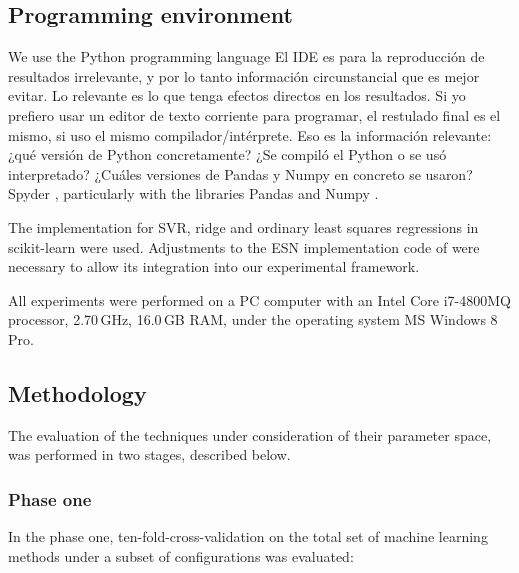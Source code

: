 \subsection{Programming environment}

We use the Python programming language %
{El IDE es para la reproducción de resultados irrelevante, y por lo
  tanto información circunstancial que es mejor evitar.  Lo relevante
  es lo que tenga efectos directos en los resultados.  Si yo prefiero
  usar un editor de texto corriente para programar, el restulado final
  es el mismo, si uso el mismo compilador/intérprete.  Eso es la
  información relevante: ¿qué versión de Python concretamente? ¿Se
  compiló el Python o se usó interpretado?  ¿Cuáles versiones de
  Pandas y Numpy en concreto se usaron?} %
Spyder \citep{Continuum2015}, particularly with the libraries Pandas
\citep{mckinneypandas2010} and Numpy \citep{vanderWalt2011}.

The implementation for SVR, ridge and ordinary least squares
regressions in scikit-learn \citep{scikitlearn2011} were used.
%
Adjustments to the ESN implementation code of \citet{Lukose2012} were
necessary to allow its integration into our experimental
framework.

All experiments were performed on a PC computer with an
Intel\textsuperscript{\textregistered} Core i7-4800MQ processor,
2.70\,GHz, 16.0\,GB RAM, under the operating system MS Windows 8 Pro.

\subsection{Methodology}

The evaluation of the techniques under consideration of their
parameter space, was performed in two stages, described below.

\subsubsection{Phase one} 

In the phase one, ten-fold-cross-validation on the total set of
machine learning methods under a subset of configurations was evaluated:

